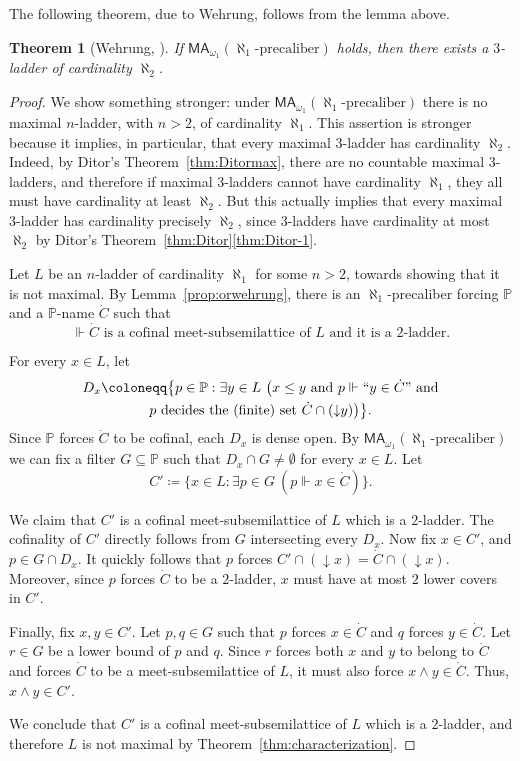 \documentclass[]{amsart}
\newtheorem{theorem}{Theorem}[section]
\theoremstyle{definition}
\theoremstyle{remark}
\begin{document}
The following theorem, due to Wehrung, follows from the lemma above. 
\begin{theorem}[{Wehrung, \cite[Theorem 7.9]{MR2609217}}]\label{thm:orwherung}
If $\mathsf{MA}_{\omega_1}(\aleph_1\text{-precaliber})$ holds, then there exists a $3$-ladder of cardinality $\aleph_2$.
\end{theorem}
\begin{proof}
We show something stronger: under $\mathsf{MA}_{\omega_1}(\aleph_1\text{-precaliber})$ there is no maximal $n$-ladder, with $n > 2$, of cardinality $\aleph_1$. This assertion is stronger because it implies, in particular, that every maximal $3$-ladder has cardinality $\aleph_2$. Indeed, by Ditor's Theorem~\ref{thm:Ditormax}, there are no countable maximal $3$-ladders, and therefore if maximal $3$-ladders cannot have cardinality $\aleph_1$, they all must have cardinality at least $\aleph_2$. But this actually implies that every maximal $3$-ladder has cardinality precisely $\aleph_2$, since $3$-ladders have cardinality at most $\aleph_2$ by Ditor's Theorem~\ref{thm:Ditor}\ref{thm:Ditor-1}.

Let $L$ be an $n$-ladder of cardinality $\aleph_1$ for some $n > 2$, towards showing that it is not maximal. By Lemma~\ref{prop:orwehrung}, there is an $\aleph_1$-precaliber forcing $\mathbb{P}$ and a $\mathbb{P}$-name $\dot{C}$ such that 
\[
\Vdash \dot{C} \text{ is a cofinal meet-subsemilattice of } L \text{ and it is a } 2\text{-ladder}. 
\]

For every $x \in L$, let 
\begin{multline*}
D_x \coloneqq \big\{p \in \mathbb{P} : \exists y \in L \ \big( x \le y \text{ and } p \Vdash ``y \in \dot{C}" \text{ and} \\p \text{ decides the (finite) set } \dot{C} \cap ({\downarrow} y)\big)\big\}.
\end{multline*}
Since $\mathbb{P}$ forces $\dot{C}$ to be cofinal, each $D_x$ is dense open. By $\mathsf{MA}_{\omega_1}(\aleph_1\text{-precaliber})$ we can fix a filter $G \subseteq \mathbb{P}$ such that $D_x \cap G \neq \emptyset$ for every $x \in L$. Let
\[
C' \coloneqq \big\{x \in L : \exists p \in G \ (p \Vdash x \in \dot{C})\big\}.
\]

We claim that $C'$ is a cofinal meet-subsemilattice of $L$ which is a $2$-ladder. The cofinality of $C'$ directly follows from $G$ intersecting every $D_x$. Now fix  $x \in C'$, and $p \in G \cap D_x$. It quickly follows that $p$ forces $C' \cap ({\downarrow} x) = \dot{C} \cap ({\downarrow} x)$. Moreover, since $p$ forces $\dot{C}$ to be a $2$-ladder, $x$ must have at most $2$ lower covers in $C'$.

 Finally, fix $x, y \in C'$. Let $p, q \in G$ such that $p$ forces $x \in \dot{C}$ and $q$ forces $y \in \dot{C}$. Let $r\in G$ be a lower bound of $p$ and $q$. Since $r$ forces both $x$ and $y$ to belong to $\dot{C}$ and forces $\dot{C}$ to be a meet-subsemilattice of $L$, it must also force $x \wedge y \in \dot{C}$. Thus, $x \wedge y \in C'$.

We conclude that $C'$ is a cofinal meet-subsemilattice of $L$ which is a $2$-ladder, and therefore $L$ is not maximal by Theorem~\ref{thm:characterization}.
\end{proof}
\end{document}
